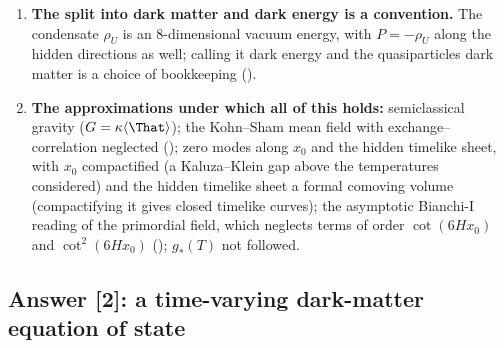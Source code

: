 \begin{enumerate}
        (). The only frozen-compatible Kohn--Sham fable is radiation ().
  \item \textbf{The split into dark matter and dark energy is a convention.} The condensate $\rho_U$ is an
        8-dimensional vacuum energy, with $P=-\rho_U$ along the hidden directions as well; calling it dark
        energy and the quasiparticles dark matter is a choice of bookkeeping ().
  \item \textbf{The approximations under which all of this holds:} semiclassical gravity
        ($G=\kappa\langle\That\rangle$); the Kohn--Sham mean field with exchange--correlation neglected
        (); zero modes along $x_0$ and the hidden timelike sheet, with $x_0$ compactified (a
        Kaluza--Klein gap above the temperatures considered) and the hidden timelike sheet a formal comoving
        volume (compactifying it gives closed timelike curves); the asymptotic Bianchi-I reading of the
        primordial field, which neglects terms of order $\cot(6Hx_0)$ and $\cot^2(6Hx_0)$ ();
        $g_*(T)$ not followed.
\end{enumerate}

\subsection{Answer [2]: a time-varying dark-matter equation of state}
\label{sec:10.2}

